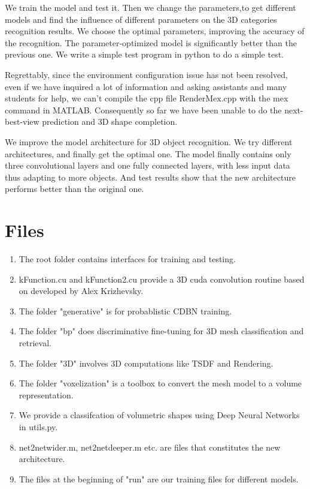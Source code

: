 \documentclass[11pt,journal,compsoc]{IEEEtran}
\begin{document}
  We train the model and test it. Then we change the parameters,to get different models and find the influence of different parameters on the 3D categories recognition results. We choose the optimal parameters, improving the accuracy of the recognition. The parameter-optimized model is significantly better than the previous one. We write a simple test program in python to do a simple test. 

  Regrettably, since the environment configuration issue has not been resolved, even if we have inquired a lot of information and asking assistants and many students for help, we can't compile the cpp file RenderMex.cpp with the mex command in MATLAB. Consequently so far we have been unable to do the next-best-view prediction and 3D shape completion.

  We improve the model architecture for 3D object recognition. 
  We try different architectures, and finally get the optimal one. The model finally contains only three convolutional layers and one fully connected layers, with less input data thus adapting to more objects. And test results show that the new architecture performs better than the original one.

  \appendices
  \section{Files}
    \begin{enumerate}
      \item The root folder contains interfaces for training and testing.
      \item kFunction.cu and kFunction2.cu provide a 3D cuda convolution routine based on developed by Alex Krizhevsky.
      \item The folder "generative" is for probablistic CDBN training.
      \item The folder "bp" does discriminative fine-tuning for 3D mesh classification and retrieval.
      \item The folder "3D" involves 3D computations like TSDF and Rendering.
      \item The folder "voxelization" is a toolbox to convert the mesh model to a volume representation. 
      \item We provide a classifcation of volumetric shapes using Deep Neural Networks in utils.py.
      \item net2netwider.m, net2netdeeper.m etc. are files that constitutes the new architecture.
      \item The files at the beginning of "run" are our training files for different models.
    \end{enumerate}
\end{document}
